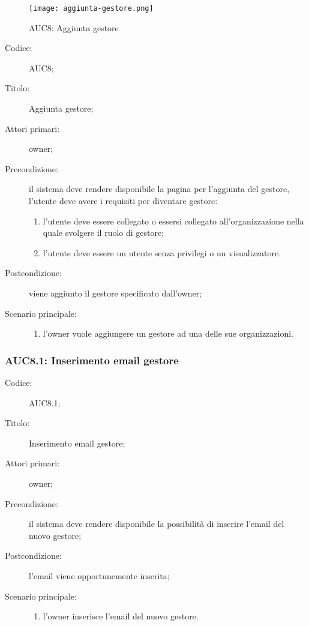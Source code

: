 \documentclass[../../../analisi-dei-requisiti.tex]{subfiles}
\begin{document}
\begin{figure}[H]
  \centering
  \texttt{[image: aggiunta-gestore.png]}
  \caption{AUC8: Aggiunta gestore}%
  \label{fig:AUC8}
\end{figure}

\begin{description}
  \item[Codice:] AUC8;
  \item[Titolo:] Aggiunta gestore;
  \item[Attori primari:] owner;
  \item[Precondizione:] il sistema deve rendere disponibile la pagina per l'aggiunta del gestore, l'utente deve avere i requisiti per diventare gestore:
  \begin{enumerate}
    \item l'utente deve essere collegato o essersi collegato all'organizzazione nella quale svolgere il ruolo di gestore;
    \item l'utente deve essere un utente senza privilegi o un visualizzatore.
  \end{enumerate}
  \item[Postcondizione:] viene aggiunto il gestore specificato dall'owner;
  \item[Scenario principale:]
  \begin{enumerate}
    \item l'owner vuole aggiungere un gestore ad una delle sue organizzazioni.
  \end{enumerate}
\end{description}

\subsubsection{AUC8.1: Inserimento email gestore}%
\label{subs:AUC8.1}
\begin{description}
  \item[Codice:] AUC8.1;
  \item[Titolo:] Inserimento email gestore;
  \item[Attori primari:] owner;
  \item[Precondizione:] il sistema deve rendere disponibile la possibilità di inserire l'email del nuovo gestore;
  \item[Postcondizione:] l'email viene opportunemente inserita;
  \item[Scenario principale:]
  \begin{enumerate}
    \item l'owner inserisce l'email del nuovo gestore.
  \end{enumerate}
\end{description}
\end{document}

